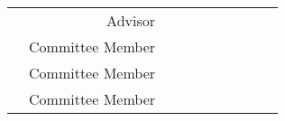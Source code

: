 \thispagestyle{empty}
\begin{center}
    \spacedlowsmallcaps{\myName} \\ \medskip                        

    \begingroup
        \color{Maroon}\spacedallcaps{\myTitle}
    \endgroup
\end{center}        

\begin{tabular}{Xrl}
 & Advisor          & {~~~~~~~~~~~~~~} \\
 & Committee Member & {~~~~~~~~~~~~~~} \\
 & Committee Member & {~~~~~~~~~~~~~~} \\
 & Committee Member & {~~~~~~~~~~~~~~} \\
\end{tabular}
